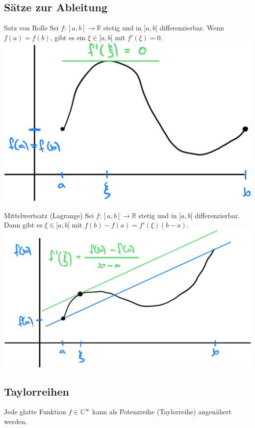 \documentclass[a4paper,10pt]{article}
\def\R{\mathbb{R}}
\def\C{\mathbb{C}}
\begin{document}
\subsection{Sätze zur Ableitung}
\begin{subbox}{Satz von Rolle}
 Sei $f: [a,b] \to \R$ stetig und in $]a,b[$ differenzierbar. Wenn $f(a) = f(b)$, gibt es ein $\xi \in ]a,b[$ mit $f'(\xi) = 0$.
 \includegraphics[width=\linewidth]{Satz von Rolle.png}
\end{subbox}
\begin{mainbox}{Mittelwertsatz (Lagrange)}
 Sei $f: [a,b] \to \R$ stetig und in $]a,b[$ differenzierbar. Dann gibt es $\xi \in ]a,b[$ mit $f(b) - f(a) = f'(\xi)(b-a)$.
 \includegraphics[width=\linewidth]{Lagrange.png}
\end{mainbox}

\subsection{Taylorreihen}
Jede glatte Funktion $f \in \C^\infty$ kann als Potenzreihe (Taylorreihe) angenähert werden.
\end{document}
